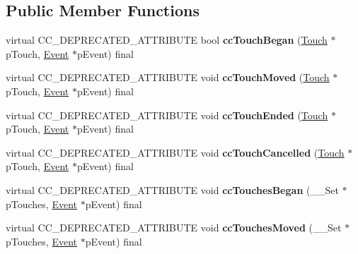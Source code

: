 \subsection*{Public Member Functions}
\begin{DoxyCompactItemize}
\item 
\mbox{\label{classLayer_ae630e893c049982100fa89117e54f101}} 
virtual C\+C\+\_\+\+D\+E\+P\+R\+E\+C\+A\+T\+E\+D\+\_\+\+A\+T\+T\+R\+I\+B\+U\+TE bool {\bfseries cc\+Touch\+Began} (\hyperlink{classTouch}{Touch} $\ast$p\+Touch, \hyperlink{classEvent}{Event} $\ast$p\+Event) final
\item 
\mbox{\label{classLayer_ac749a627e3ac8969115ac0e56a211a5d}} 
virtual C\+C\+\_\+\+D\+E\+P\+R\+E\+C\+A\+T\+E\+D\+\_\+\+A\+T\+T\+R\+I\+B\+U\+TE void {\bfseries cc\+Touch\+Moved} (\hyperlink{classTouch}{Touch} $\ast$p\+Touch, \hyperlink{classEvent}{Event} $\ast$p\+Event) final
\item 
\mbox{\label{classLayer_affedf550a1a11a280dd91b58ecc682ea}} 
virtual C\+C\+\_\+\+D\+E\+P\+R\+E\+C\+A\+T\+E\+D\+\_\+\+A\+T\+T\+R\+I\+B\+U\+TE void {\bfseries cc\+Touch\+Ended} (\hyperlink{classTouch}{Touch} $\ast$p\+Touch, \hyperlink{classEvent}{Event} $\ast$p\+Event) final
\item 
\mbox{\label{classLayer_a61af6998ab902f9c5b0a949c6821772d}} 
virtual C\+C\+\_\+\+D\+E\+P\+R\+E\+C\+A\+T\+E\+D\+\_\+\+A\+T\+T\+R\+I\+B\+U\+TE void {\bfseries cc\+Touch\+Cancelled} (\hyperlink{classTouch}{Touch} $\ast$p\+Touch, \hyperlink{classEvent}{Event} $\ast$p\+Event) final
\item 
\mbox{\label{classLayer_aa21822d5e058f95a171333755fb9da05}} 
virtual C\+C\+\_\+\+D\+E\+P\+R\+E\+C\+A\+T\+E\+D\+\_\+\+A\+T\+T\+R\+I\+B\+U\+TE void {\bfseries cc\+Touches\+Began} (\+\_\+\+\_\+\+Set $\ast$p\+Touches, \hyperlink{classEvent}{Event} $\ast$p\+Event) final
\item 
\mbox{\label{classLayer_a1b52d1828b5fcfae6da2d0c44bd39372}} 
virtual C\+C\+\_\+\+D\+E\+P\+R\+E\+C\+A\+T\+E\+D\+\_\+\+A\+T\+T\+R\+I\+B\+U\+TE void {\bfseries cc\+Touches\+Moved} (\+\_\+\+\_\+\+Set $\ast$p\+Touches, \hyperlink{classEvent}{Event} $\ast$p\+Event) final
\item 
\mbox{\label{classLayer_a2261a657097ec2691076be2b3662bd44}} 

\end{DoxyCompactItemize}
